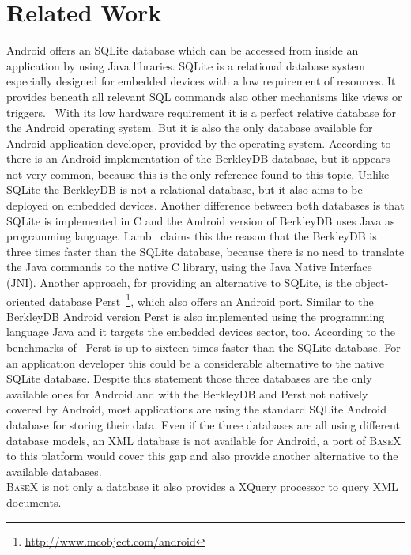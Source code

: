 \section{Related Work}
\label{sec:overview:related-work}
Android offers an SQLite database which can be accessed from inside an application by using Java libraries.
SQLite is a relational database system especially designed for embedded devices with a low requirement of resources.
It provides beneath all relevant SQL commands also other mechanisms like views or triggers.~\cite{owens2006definitive}
With its low hardware requirement it is a perfect relative database for the Android operating system.
But it is also the only database available for Android application developer, provided by the operating system.
According to \cite{lamb2010berkleydb} there is an Android implementation of the BerkleyDB database, but it appears not very common, because this is the only reference found to this topic.
Unlike SQLite the BerkleyDB is not a relational database, but it also aims to be deployed on embedded devices.
Another difference between both databases is that SQLite is implemented in C and the Android version of BerkleyDB uses Java as programming language.
Lamb~\cite{lamb2010berkleydb} claims this the reason that the BerkleyDB is three times faster than the SQLite database, because there is no need to translate the Java commands to the native C library, using the Java Native Interface (JNI).
Another approach, for providing an alternative to SQLite, is the object-oriented database Perst~\footnote{\url{http://www.mcobject.com/android}}, which also offers an Android port.
Similar to the BerkleyDB Android version Perst is also implemented using the programming language Java and it targets the embedded devices sector, too.
According to the benchmarks of~\cite{perst-bench} Perst is up to sixteen times faster than the SQLite database.
For an application developer this could be a considerable alternative to the native SQLite database.
Despite this statement those three databases are the only available ones for Android and with the BerkleyDB and Perst not natively covered by Android, most applications are using the standard SQLite Android database for storing their data.
Even if the three databases are all using different database models, an XML database is not available for Android, a port of \textsc{BaseX} to this platform would cover this gap and also provide another alternative to the available databases.\\
\textsc{BaseX} is not only a database it also provides a XQuery processor to query XML documents.
